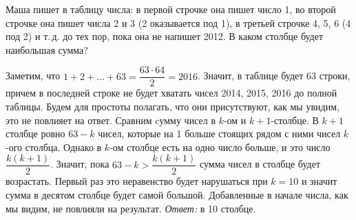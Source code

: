 Маша пишет в таблицу числа:
в первой строчке она пишет число 1, во второй строчке она пишет числа 2 и 3
(2 оказывается под 1), в третьей строчке 4, 5, 6 (4 под 2) и т.\,д. до тех
пор, пока она не напишет 2012.
В каком столбце будет наибольшая сумма?


\solution
Заметим, что
$1 + 2 + \ldots + 63 = \dfrac{63 \cdot 64}{2} = 2016$.
Значит, в таблице будет 63 строки, причем в последней строке не будет хватать
чисел 2014, 2015, 2016 до полной таблицы.
Будем для простоты полагать, что они присутствуют, как мы увидим, это не
повлияет на ответ.
Сравним cумму чисел в $k$-ом и $k + 1$-столбце.
В $k + 1$ столбце ровно $63 - k$ чисел, которые на 1 больше стоящих рядом с
ними чисел $k$-ого столбца.
Однако в $k$-ом столбце есть на одно число больше, и это число
$\dfrac{k (k + 1)}{2}$.
Значит, пока $63 - k > \dfrac{k (k + 1)}{2}$ сумма чисел в столбце будет
возрастать.
Первый раз это неравенство будет нарушаться при $k = 10$ и значит сумма в
десятом столбце будет самой большой.
Добавленные в начале числа, как мы видим, не повлияли на результат.
\emph{Ответ:} в 10 столбце.

